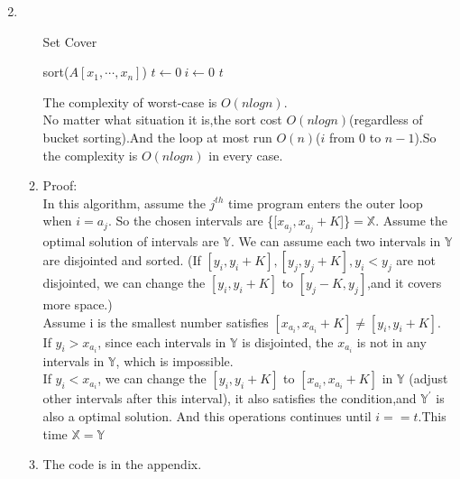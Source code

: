 \documentclass[12pt,a4paper]{article}
\makeatletter
\newtheorem*{solution}{Solution}
\theoremstyle{definition}
\renewenvironment{solution}[1][Solution] {\par\pushQED{\qed}\normalfont\topsep6\p@\@plus6\p@\relax\trivlist\item[\hskip\labelsep\bfseries#1\@addpunct{.}]\ignorespaces}{\popQED\endtrivlist\@endpefalse} \makeatother
\makeatother
\begin{document}
\begin{enumerate}
\begin{solution}
\begin{enumerate}
\begin{algorithm}[H]
		\BlankLine
		\caption{Set Cover}\label{Alg-quicksort}
		
		sort($A[x_1,\cdots,x_n]$)\;
		$t\leftarrow 0 ~i \leftarrow 0$\;
		\Return $t$
	\end{algorithm}
	The complexity of worst-case is $O(nlogn)$. \\
	No matter what situation it is,the sort cost $O(nlogn)$(regardless of bucket sorting).And the loop at most run $O(n)$($i$ from $0$ to $n-1$).So the complexity is $O(nlogn)$ in every case. 
	\item 	Proof:\\
	In this algorithm, assume the $j^{th}$ time program enters the outer loop when $i=a_j$. So the chosen intervals are \{[$x_{a_j},x_{a_j}+K$]\}$=\mathbb{X}$. Assume the optimal solution of intervals are $\mathbb{Y}$. We can assume each two intervals in $\mathbb{Y}$ are disjointed and sorted. (If $[y_i,y_i+K],[y_j,y_j+K],y_i<y_j$ are not disjointed, we can change the  $[y_i,y_i+K]$ to $[y_j-K,y_j]$,and it covers more space.)\\
	Assume i is the smallest number satisfies $[x_{a_i},x_{a_i}+K]\neq [y_i,y_i+K]$.\\
	If $y_i>x_{a_i}$, since each intervals in $\mathbb{Y}$ is disjointed, the $x_{a_i}$ is not in any intervals in $\mathbb{Y}$, which is impossible.\\
	If $y_i<x_{a_i}$, we can change the $[y_i,y_i+K]$ to $[x_{a_i},x_{a_i}+K]$ in $\mathbb{Y}$ (adjust other intervals after this interval), it also satisfies the condition,and $\mathbb{Y^{'}}$ is also a optimal solution. And this operations continues until $i==t$.This time $\mathbb{X}=\mathbb{Y}$
	\item The code is in the appendix.
   \end{enumerate}
    \end{solution}

\end{enumerate}



\vspace{20pt}
\appendix
\end{document}
